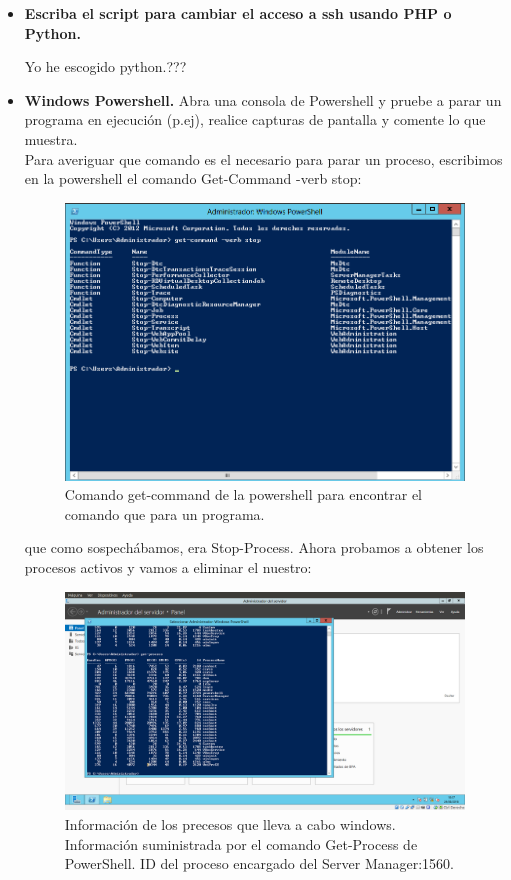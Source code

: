 \begin{itemize}
	\item \textbf{Escriba el script para cambiar el acceso a ssh usando PHP o Python.}
	
	Yo he escogido python.???

	\item \textbf{Windows Powershell.} Abra una consola de Powershell y pruebe a parar un programa en ejecución (p.ej), realice capturas de pantalla y comente lo que muestra.\\
	
	Para averiguar que comando es el necesario para parar un proceso, escribimos en la powershell el comando Get-Command -verb stop:\\
	
	\begin{figure}[H]
		\centering
		\includegraphics[width=0.7\linewidth]{PoweshellGetCommand}
		\caption[Powershell]{Comando get-command de la powershell para encontrar el comando que para un programa.}
		\label{fig:PoweshellGetCommand}
	\end{figure}

	que como sospechábamos, era Stop-Process. Ahora probamos a obtener los procesos activos y vamos a eliminar el nuestro:\\
	
	\begin{figure}[H]
		\centering
		\includegraphics[width=0.7\linewidth]{PowershellProcesos}
		\caption[Procesos powershell]{Información de los precesos que lleva a cabo windows. Información suministrada por el comando Get-Process de PowerShell. ID del proceso encargado del Server Manager:1560.}
		\label{fig:PowershellProcesos}
	\end{figure}
	

\end{itemize}
